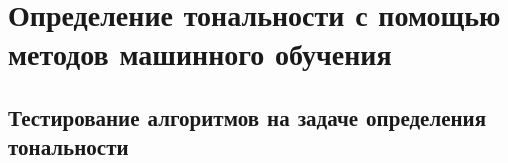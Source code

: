 \section{Определение тональности с помощью методов машинного обучения} 
\label{sec:sec_mlsent}






\subsection{Тестирование алгоритмов на задаче определения тональности}